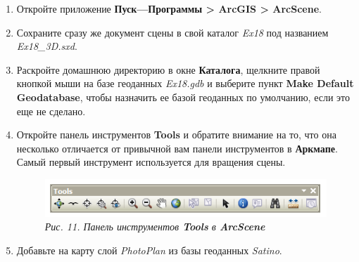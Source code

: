 \documentclass[12pt,]{book}
\begin{document}
\begin{enumerate}
\def\labelenumi{\arabic{enumi}.}
\item
  Откройте приложение \textbf{Пуск---Программы \textgreater{} ArcGIS \textgreater{} ArcScene}.
\item
  Сохраните сразу же документ сцены в свой каталог \emph{Ex18} под названием \emph{Ex18\_3D.sxd}.
\item
  Раскройте домашнюю директорию в окне \textbf{Каталога}, щелкните правой кнопкой мыши на базе геоданных \emph{Ex18.gdb} и выберите пункт \textbf{Make Default Geodatabase}, чтобы назначить ее базой геоданных по умолчанию, если это еще не сделано.
\item
  Откройте панель инструментов \textbf{Tools} и обратите внимание на то, что она несколько отличается от привычной вам панели инструментов в \textbf{Аркмапе}. Самый первый инструмент используется для вращения сцены.

  \begin{figure}
  \centering
  \includegraphics{images/Ex18/image12.png}
  \caption{\emph{Рис. 11. Панель инструментов \textbf{Tools} в \textbf{ArcScene} }}
  \end{figure}
\item
  Добавьте на карту слой \emph{PhotoPlan} из базы геоданных \emph{Satino}.


\end{enumerate}
\end{document}
